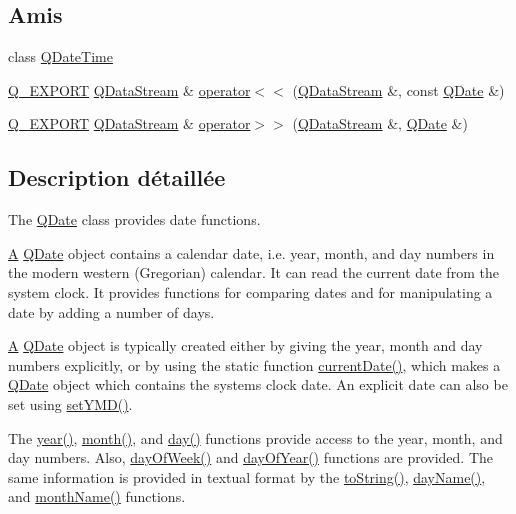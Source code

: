 \subsection*{Amis}
\begin{DoxyCompactItemize}
\item 
class \hyperlink{class_q_date_a9d2632bde958bcaf78a589a11578452e}{Q\+Date\+Time}
\item 
\hyperlink{qglobal_8h_a7323ea4c33b4021dee51e9b1f773538d}{Q\+\_\+\+E\+X\+P\+O\+R\+T} \hyperlink{class_q_data_stream}{Q\+Data\+Stream} \& \hyperlink{class_q_date_aebb24cfcc74a8440d7aff4d211276ab8}{operator$<$$<$} (\hyperlink{class_q_data_stream}{Q\+Data\+Stream} \&, const \hyperlink{class_q_date}{Q\+Date} \&)
\item 
\hyperlink{qglobal_8h_a7323ea4c33b4021dee51e9b1f773538d}{Q\+\_\+\+E\+X\+P\+O\+R\+T} \hyperlink{class_q_data_stream}{Q\+Data\+Stream} \& \hyperlink{class_q_date_ace58c33ac3870ee3b24fb6ce8db6f269}{operator$>$$>$} (\hyperlink{class_q_data_stream}{Q\+Data\+Stream} \&, \hyperlink{class_q_date}{Q\+Date} \&)
\end{DoxyCompactItemize}


\subsection{Description détaillée}
The \hyperlink{class_q_date}{Q\+Date} class provides date functions. 

\hyperlink{class_a}{A} \hyperlink{class_q_date}{Q\+Date} object contains a calendar date, i.\+e. year, month, and day numbers in the modern western (Gregorian) calendar. It can read the current date from the system clock. It provides functions for comparing dates and for manipulating a date by adding a number of days.

\hyperlink{class_a}{A} \hyperlink{class_q_date}{Q\+Date} object is typically created either by giving the year, month and day numbers explicitly, or by using the static function \hyperlink{class_q_date_a7112e1452f46e40cf349f2e769887e1c}{current\+Date()}, which makes a \hyperlink{class_q_date}{Q\+Date} object which contains the system\textquotesingle{}s clock date. An explicit date can also be set using \hyperlink{class_q_date_ae25b0507f1694495d64ff068b0baa50e}{set\+Y\+M\+D()}.

The \hyperlink{class_q_date_a88d2a135c6094f3e67cd1d125931dda5}{year()}, \hyperlink{class_q_date_a1b00f4cc57ae72ea2669650833873ea2}{month()}, and \hyperlink{class_q_date_aa66120bb558e981ac505d0fa4113a844}{day()} functions provide access to the year, month, and day numbers. Also, \hyperlink{class_q_date_adea77eac7776e9441c9107f4b15528ce}{day\+Of\+Week()} and \hyperlink{class_q_date_a62e2463ded1a429298b00d2c6ca225b0}{day\+Of\+Year()} functions are provided. The same information is provided in textual format by the \hyperlink{class_q_date_a206d47235315d1c0b861d901a4ab37e8}{to\+String()}, \hyperlink{class_q_date_a5a14c1d69f0c4a51bba1d4756f110ad0}{day\+Name()}, and \hyperlink{class_q_date_a751b3290d394578b2ebd3b5fa3a65d1c}{month\+Name()} functions.

